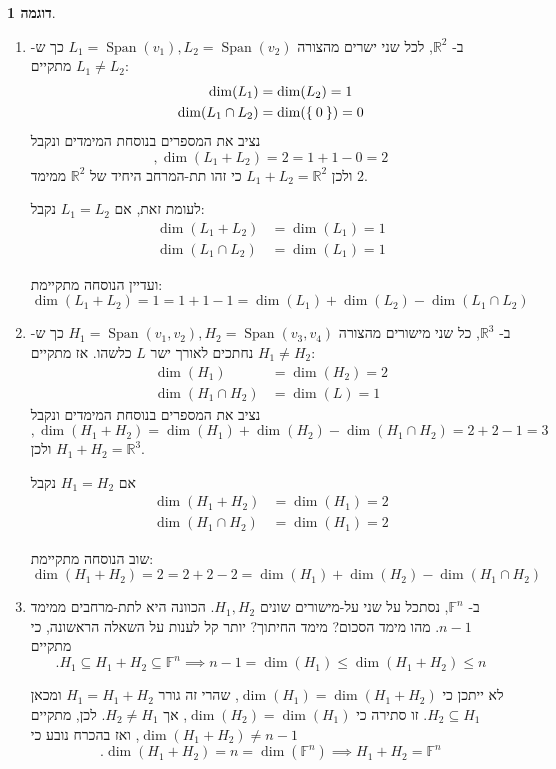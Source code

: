 \documentclass[12pt]{report}
\theoremstyle{plain}
\theoremstyle{definition}
\newtheorem{example}{דוגמה}[chapter]
\newcommand{\R}{\mathbb{R}}
\newcommand{\F}{\mathbb{F}}
\newcommand{\0}{\mathbf{0}}
\DeclareMathOperator{\Span}{Span}
\begin{document}
\begin{example}\
\begin{enumerate}[label=\alph*.]
\item 
ב-
$\R^2$,
לכל שני ישרים  מהצורה
$L_1=\Span(v_1),L_2=\Span(v_2)$
כך ש-
$L_1\neq L_2$
מתקיים:
$$
\begin{aligned}
\dim(L_1)&=\dim(L_2)=1 \\
\dim(L_1\cap L_2)&=\dim(\Set{0})=0
\end{aligned}
$$
נציב את המספרים בנוסחת המימדים ונקבל
$$
,\dim(L_1+L_2)=2=1+1-0=2
$$
ולכן
$L_1+L_2=\R^2$
כי זהו תת-המרחב היחיד של 
$\R^2$
ממימד 
$2$.

לעומת זאת, אם
$L_1=L_2$
נקבל:
$$
\begin{aligned}
\dim(L_1+L_2)&=\dim(L_1)=1\\
\dim(L_1\cap L_2)&=\dim(L_1)=1
\end{aligned}
$$

ועדיין הנוסחה מתקיימת:
$$
\dim(L_1+L_2)=1=1+1-1=\dim(L_1)+\dim(L_2)-\dim(L_1\cap L_2)
$$


\item 
ב-
$\R^3$,
כל שני מישורים מהצורה
$H_1=\Span(v_1,v_2),H_2=\Span(v_3,v_4)$
כך ש-
$H_1\neq H_2$
נחתכים לאורך ישר
$L$
כלשהו. אז מתקיים:
$$
\begin{aligned}
\dim(H_1)&=\dim(H_2)=2 \\
\dim(H_1\cap H_2)&=\dim(L)=1
\end{aligned}
$$
נציב את המספרים בנוסחת המימדים ונקבל
$$
,\dim(H_1+H_2)=\dim(H_1)+\dim(H_2)-\dim(H_1\cap H_2)=2+2-1=3
$$
ולכן
$H_1+H_2=\R^3$.

אם
$H_1=H_2$
נקבל
$$
\begin{aligned}
\dim(H_1+H_2)&=\dim(H_1)=2\\
\dim(H_1\cap H_2)&=\dim(H_1)=2
\end{aligned}
$$

שוב הנוסחה מתקיימת:
$$
\dim(H_1+H_2)=2=2+2-2=\dim(H_1)+\dim(H_2)-\dim(H_1\cap H_2)
$$


\item 
ב-
$\F^n$,
נסתכל על שני על-מישורים שונים 
$H_1,H_2$.
הכוונה היא לתת-מרחבים ממימד 
$n-1$.
מהו מימד הסכום? מימד החיתוך? יותר קל לענות על השאלה הראשונה, כי מתקיים
$$
.H_1\subseteq H_1+H_2\subseteq \F^n \implies n-1=\dim(H_1)\leq\dim(H_1+H_2)\leq n
$$

לא ייתכן כי
$\dim(H_1)=\dim(H_1+H_2)$,
שהרי זה גורר 
$H_1=H_1+H_2$
ומכאן
$H_2\subseteq H_1$.
זו סתירה כי
$\dim(H_2)=\dim(H_1)$,
אך
$H_2\neq H_1$.
לכן, מתקיים
$\dim(H_1+H_2)\neq n-1$,
ואז בהכרח נובע כי
$$
.\dim(H_1+H_2)=n=\dim(\F^n) \implies H_1+H_2=\F^n
$$


\end{enumerate}
\end{example}
\end{document}
